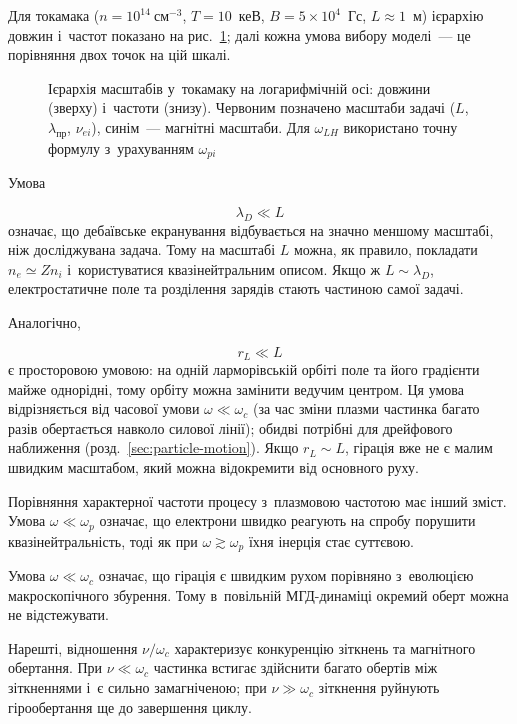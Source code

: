 Для токамака ($n=10^{14}~\mathrm{см}^{-3}$, $T=10$~кеВ, $B=5\times10^{4}$~Гс, $L\approx1$~м)
ієрархію довжин і~частот показано на рис.~\ref{fig:scales-hierarchy}; далі кожна умова вибору
моделі~--- це порівняння двох точок на цій шкалі.

\begin{figure}[ht]\centering
	\caption{Ієрархія масштабів у~токамаку на логарифмічній осі: довжини (зверху) і~частоти (знизу).
	Червоним позначено масштаби задачі ($L$, $\lambda_{\mathrm{пр}}$, $\nu_{ei}$), синім~--- магнітні масштаби.
	Для $\omega_{LH}$ використано точну формулу з~урахуванням $\omega_{pi}$}
	\label{fig:scales-hierarchy}
\end{figure}

Умова

\begin{equation*}
\lambda_D\ll L
\end{equation*}
%
означає, що дебаївське екранування відбувається на значно меншому
масштабі, ніж досліджувана задача. Тому на масштабі $L$ можна, як
правило, покладати $n_e\simeq Zn_i$ і~користуватися
квазінейтральним описом. Якщо ж $L\sim\lambda_D$, електростатичне поле
та розділення зарядів стають частиною самої задачі.

Аналогічно,

\begin{equation*}
r_L\ll L
\end{equation*}
%
є просторовою умовою: на одній ларморівській орбіті поле та його градієнти
майже однорідні, тому орбіту можна замінити ведучим центром. Ця умова відрізняється від
часової умови $\omega\ll\omega_c$ (за час зміни плазми частинка багато разів
обертається навколо силової лінії); обидві потрібні для дрейфового наближення
(розд.~\ref{sec:particle-motion}). Якщо $r_L\sim L$, гірація вже
не є малим швидким масштабом, який можна відокремити від основного
руху.

Порівняння характерної частоти процесу з~плазмовою частотою має інший
зміст. Умова $\omega\ll\omega_p$ означає, що електрони швидко реагують
на спробу порушити квазінейтральність, тоді як при
$\omega\gtrsim\omega_p$ їхня інерція стає суттєвою.

Умова $\omega\ll\omega_c$ означає, що гірація є швидким рухом
порівняно з~еволюцією макроскопічного збурення. Тому в~повільній
МГД-динаміці окремий оберт можна не відстежувати.

Нарешті, відношення $\nu/\omega_c$ характеризує конкуренцію зіткнень
та магнітного обертання. При $\nu\ll\omega_c$ частинка встигає
здійснити багато обертів між зіткненнями і~є сильно замагніченою;
при $\nu\gg\omega_c$ зіткнення руйнують гірообертання ще до завершення
циклу.


